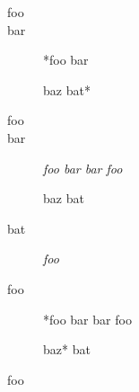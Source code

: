 \begin{description}
\item[foo]

\item[bar]

*foo bar

baz bat*

\item[foo]

\item[bar]

\emph{foo bar
bar foo}

baz bat

\item[bat]

\emph{foo}

\item[foo]

*foo bar
bar foo

baz* bat
\end{description}

foo
